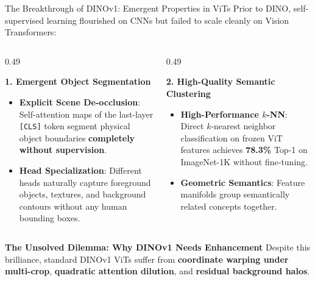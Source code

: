 \documentclass[aspectratio=169,10pt]{beamer}
\begin{document}
\begin{frame}{The Breakthrough of DINOv1: Emergent Properties in ViTs}
\vspace{-0.4em}
Prior to DINO, self-supervised learning flourished on CNNs but failed to scale cleanly on Vision Transformers:

\vspace{0.2em}
\begin{columns}[t]
    \begin{column}{0.49\textwidth}
        \begin{exampleblock}{\textbf{1. Emergent Object Segmentation}}
            \small
            \begin{itemize}\setlength{\itemsep}{2pt}
                \item \textbf{Explicit Scene De-occlusion}: Self-attention maps of the last-layer \texttt{[CLS]} token segment physical object boundaries \textbf{completely without supervision}.
                \item \textbf{Head Specialization}: Different heads naturally capture foreground objects, textures, and background contours without any human bounding boxes.
            \end{itemize}
        \end{exampleblock}
    \end{column}

    \begin{column}{0.49\textwidth}
        \begin{block}{\textbf{2. High-Quality Semantic Clustering}}
            \small
            \begin{itemize}\setlength{\itemsep}{2pt}
                \item \textbf{High-Performance $k$-NN}: Direct $k$-nearest neighbor classification on frozen ViT features achieves \textbf{78.3\%} Top-1 on ImageNet-1K without fine-tuning.
                \item \textbf{Geometric Semantics}: Feature manifolds group semantically related concepts together.
            \end{itemize}
        \end{block}
    \end{column}
\end{columns}

\vspace{0.3em}
\begin{alertblock}{\textbf{The Unsolved Dilemma: Why DINOv1 Needs Enhancement}}
    \centering\small
    Despite this brilliance, standard DINOv1 ViTs suffer from \textbf{coordinate warping under multi-crop}, \textbf{quadratic attention dilution}, and \textbf{residual background halos}.
\end{alertblock}
\end{frame}
\end{document}
